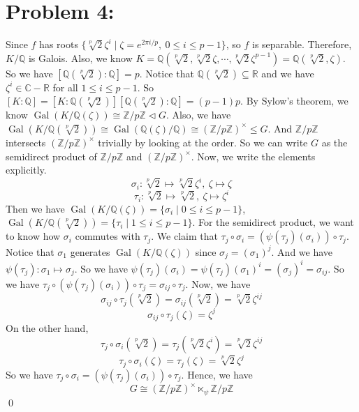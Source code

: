 \documentclass[12pt]{amsart}
\newcommand{\R}{\mathbb{R}}
\newcommand{\Q}{\mathbb{Q}}
\newcommand{\C}{\mathbb{C}}
\newcommand{\Z}{\mathbb{Z}}
\newcommand{\normal}{\triangleleft}
\newcommand{\Gal}[0]{\operatorname{Gal}}
\begin{document}
\section*{Problem 4:} Since $f$ has roots $\{\sqrt[p]{2}\zeta^i\mid \zeta=e^{2\pi i/p},\ 0\leq i\leq p-1\}$, so $f$ is separable. Therefore, $K/\Q$ is Galois. Also, we know $K=\Q(\sqrt[p]{2},\sqrt[p]{2}\zeta,\cdots, \sqrt[p]{2}\zeta^{p-1})=\Q(\sqrt[p]{2},\zeta)$. So we have $[\Q(\sqrt[p]{2}):\Q]=p$. Notice that $\Q(\sqrt[p]{2})\subseteq\R$ and we have $\zeta^i\in \C-\R$ for all $1\leq i\leq p-1$. So $[K:\Q]=[K:\Q(\sqrt[p]{2})][\Q(\sqrt[p]{2}):\Q]=(p-1)p$. By Sylow's theorem, we know $\Gal(K/\Q(\zeta))\cong\Z/p\Z\normal G$. Also, we have $\Gal(K/\Q(\sqrt[p]{2}))\cong \Gal(\Q(\zeta)/\Q)\cong (\Z/p\Z)^\times \leq G$. And $\Z/p\Z$ intersects $(\Z/p\Z)^\times$ trivially by looking at the order. So we can write $G$ as the semidirect product of $\Z/p\Z$ and $(\Z/p\Z)^\times$. Now, we write the elements explicitly. 
\[\sigma_i: \sqrt[p]{2}\mapsto \sqrt[p]{2}\zeta^i ,\ \zeta\mapsto \zeta\]
\[\tau_i: \sqrt[p]{2}\mapsto \sqrt[p]{2},\ \zeta\mapsto \zeta^i\]
Then we have $\Gal(K/\Q(\zeta))=\{\sigma_i\mid 0\leq i\leq p-1\}$, $\Gal(K/\Q(\sqrt[p]{2}))=\{\tau_i\mid 1\leq i\leq p-1\}$. For the semidirect product, we want to know how $\sigma_i$ commutes with $\tau_j$. We claim that $\tau_j\circ \sigma_i =(\psi(\tau_j)(\sigma_i))\circ \tau_j$. Notice that $\sigma_1$ generates $\Gal(K/\Q(\zeta))$ since $\sigma_j=(\sigma_1)^j$. And we have $\psi(\tau_j):\sigma_1\mapsto \sigma_j$. So we have $\psi(\tau_j)(\sigma_i)=\psi(\tau_j)(\sigma_1)^i=(\sigma_j)^i=\sigma_{ij}$. So we have $\tau_j\circ (\psi(\tau_j)(\sigma_i))\circ \tau_j=\sigma_{ij}\circ \tau_j$.
Now, we have 
\[\sigma_{ij}\circ\tau_j (\sqrt[p]{2})=\sigma_{ij}(\sqrt[p]{2})=\sqrt[p]{2}\zeta^{ij}\]
\[\sigma_{ij}\circ\tau_j (\zeta)=\zeta^{j}\]
On the other hand, 
\[ \tau_j\circ \sigma_i(\sqrt[p]{2})=\tau_j(\sqrt[p]{2}\zeta^i)=\sqrt[p]{2}\zeta^{ij}\]
\[ \tau_j\circ \sigma_i(\zeta)=\tau_j(\zeta)=\sqrt[p]{2}\zeta^{j}\]
So we have $\tau_j\circ \sigma_i =(\psi(\tau_j)(\sigma_i))\circ \tau_j$. Hence, we have 
\[G\cong (\Z/p\Z)^\times \ltimes_\psi\Z/p\Z \]
\qed
\end{document}
